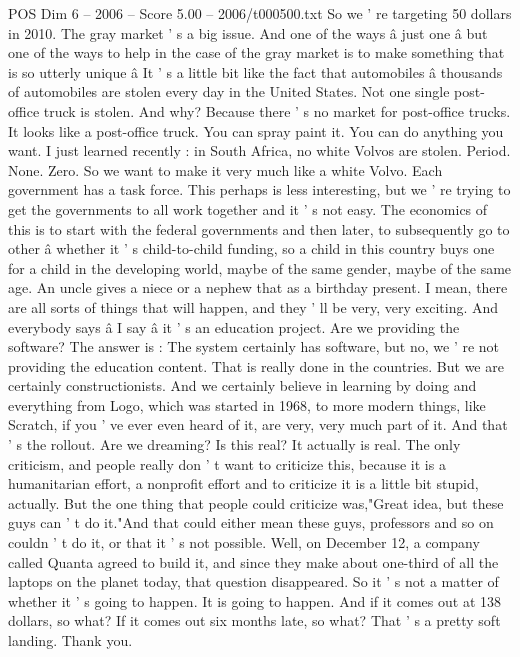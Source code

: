 \begin{textsample}{POS Dim 6 – 2006 – Score 5.00 – 2006/t000500.txt}
So we ' re targeting 50 dollars in 2010.
The gray market ' s a big issue.
And one of the ways â just one â but one of the ways to help in the case of the gray market is to make something that is so utterly unique â It ' s a little bit like the fact that automobiles â thousands of automobiles are stolen every day in the United States.
Not one single post-office truck is stolen.
And why?
Because there ' s no market for post-office trucks.
It looks like a post-office truck.
You can spray paint it.
You can do anything you want.
I just learned recently : in South Africa, no white Volvos are stolen.
Period.
None.
Zero.
So we want to make it very much like a white Volvo.
Each government has a task force.
This perhaps is less interesting, but we ' re trying to get the governments to all work together and it ' s not easy.
The economics of this is to start with the federal governments and then later, to subsequently go to other â whether it ' s child-to-child funding, so a child in this country buys one for a child in the developing world, maybe of the same gender, maybe of the same age.
An uncle gives a niece or a nephew that as a birthday present.
I mean, there are all sorts of things that will happen, and they ' ll be very, very exciting.
And everybody says â I say â it ' s an education project.
Are we providing the software?
The answer is : The system certainly has software, but no, we ' re not providing the education content.
That is really done in the countries.
But we are certainly constructionists.
And we certainly believe in learning by doing and everything from Logo, which was started in 1968, to more modern things, like Scratch, if you ' ve ever even heard of it, are very, very much part of it.
And that ' s the rollout.
Are we dreaming?
Is this real?
It actually is real.
The only criticism, and people really don ' t want to criticize this, because it is a humanitarian effort, a nonprofit effort and to criticize it is a little bit stupid, actually.
But the one thing that people could criticize was,"Great idea, but these guys can ' t do it."And that could either mean these guys, professors and so on couldn ' t do it, or that it ' s not possible.
Well, on December 12, a company called Quanta agreed to build it, and since they make about one-third of all the laptops on the planet today, that question disappeared.
So it ' s not a matter of whether it ' s going to happen.
It is going to happen.
And if it comes out at 138 dollars, so what?
If it comes out six months late, so what?
That ' s a pretty soft landing.
Thank you.

\end{textsample}
